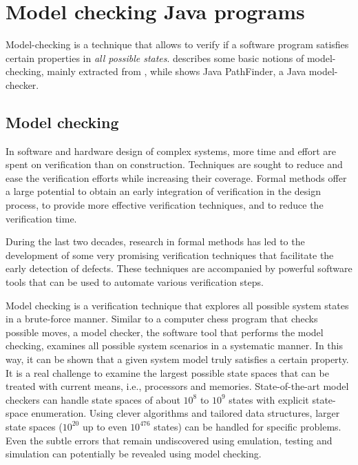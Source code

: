 
\chapter{Model checking Java programs}\label{chap:model-java}

Model-checking is a technique that allows to verify if a software program satisfies certain properties in \emph{all possible states}.
 describes some basic notions of model-checking, mainly extracted from \cite{baier2008principles}, while  shows Java PathFinder, a Java model-checker.

\section{Model checking}\label{sec:model-checking}
In software and hardware design of complex systems, more time and effort are spent on
verification than on construction. Techniques are sought to reduce and ease the verification efforts while increasing their coverage. Formal methods offer a large potential to obtain an early integration of verification in the design process, to provide more effective verification techniques, and to reduce the verification time.

During the last two decades, research in formal methods has led to the development of
some very promising verification techniques that facilitate the early detection of defects. These techniques are accompanied by powerful software tools that can be used to automate various verification steps.

Model checking is a verification technique that explores all possible system states in a brute-force manner.  Similar to a computer chess program that checks possible moves, a model checker, the software tool that performs the model checking, examines all possible system scenarios in a systematic manner. In this way, it can be shown that a given system model truly satisfies a certain property. It is a real challenge to examine the largest possible state spaces that can be treated with current means, i.e., processors and memories. State-of-the-art model checkers can handle state spaces of about $10^8$ to $10^9$ states with explicit state-space enumeration. Using clever algorithms and tailored data structures, larger state spaces ($10^{20}$ up to even $10^{476}$ states) can be handled for specific problems. Even the subtle
errors that remain undiscovered using emulation, testing and simulation can potentially be revealed using model checking.

